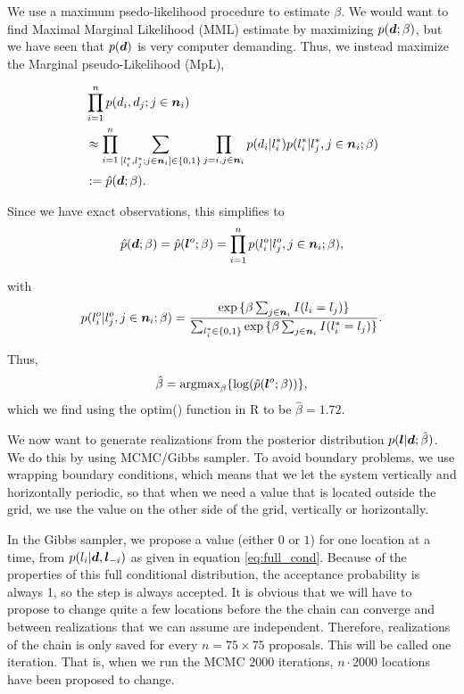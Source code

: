 We use a maximum psedo-likelihood procedure to estimate $\beta$. We would want to find Maximal Marginal Likelihood (MML) estimate by maximizing $p(\bm{d}; \beta)$, but we have seen that $p(\bm{d})$ is very computer demanding. Thus, we instead maximize the Marginal pseudo-Likelihood (MpL), 

\begin{align*}
     &\prod_{i=1}^n p(d_i, d_j; j \in \bm{n}_i)\\
    &\approx \prod_{i=1}^n \sum_{[l_i^*, l_j^*; j\in \bm{n}_i] \in \{0,1\}} \prod_{j=i, j\in \bm{n}_i} p(d_i|l_i^*)p(l_i^*|l_j^*, j\in \bm{n}_i; \beta)\\
    &:= \hat{p}(\bm{d}; \beta).
\end{align*}
 
Since we have exact observations, this simplifies to 
\begin{equation*}
    \hat{p}(\bm{d}; \beta) = \hat{p}(\bm{l}^o; \beta) = \prod_{i=1}^n p(l_i^o|l_j^o, j\in \bm{n}_i; \beta), 
\end{equation*}

with 
\begin{equation*}
    p(l_i^o|l_j^o, j\in \bm{n}_i; \beta) = \frac{\exp{\{\beta \sum_{j\in \bm{n}_i} I(l_i = l_j)\}}}{\sum_{l_i^*\in \{0,1\}}\exp{\{\beta \sum_{j\in \bm{n}_i} I(l_i^* = l_j)\}}}.
\end{equation*}

Thus, 
\begin{equation*}
    \hat\beta = \textrm{argmax}_{\beta} \{\log(\hat{p}(\bm{l}^o; \beta))\},
\end{equation*}
which we find using the optim() function in R to be $\hat\beta = 1.72$.

We now want to generate realizations from the posterior distribution $p(\bm{l}|\bm{d}; \hat\beta)$. We do this by using MCMC/Gibbs sampler. To avoid boundary problems, we use wrapping boundary conditions, which means that we let the system vertically and horizontally periodic, so that when we need a value that is located outside the grid, we use the value on the other side of the grid, vertically or horizontally.

In the Gibbs sampler, we propose a value (either $0$ or $1$) for one location at a time, from $p(l_i|\bm{d}, \bm{l}_{-i})$ as given in equation \eqref{eq:full_cond}.
Because of the properties of this full conditional distribution, the acceptance probability is always 1, so the step is always accepted. It is obvious that we will have to propose to change quite a few locations before the the chain can converge and between realizations that we can assume are independent. Therefore, realizations of the chain is only saved for every $n = 75 \times 75$ proposals. This will be called one iteration. That is, when we run the MCMC $2000$ iterations, $n\cdot 2000$ locations have been proposed to change.

